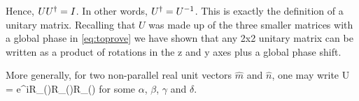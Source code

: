 Hence, $UU^\dagger = I$. In other words, $U^\dagger = U^{-1}$. This is exactly the definition of a unitary matrix. Recalling that $U$ was made up of the three smaller matrices with a global phase in \eqref{eq:toprove} we have shown that any 2x2 unitary matrix can be written as a product of rotations in the z and y axes plus a global phase shift.

More generally, for two non-parallel real unit vectors $\hat{m}$ and $\hat{n}$, one may write
\beq
U = e^{i\alpha}R_{}(\beta)R_{}(\gamma)R_{}(\delta)
\eeq
for some $\alpha$, $\beta$, $\gamma$ and $\delta$.
